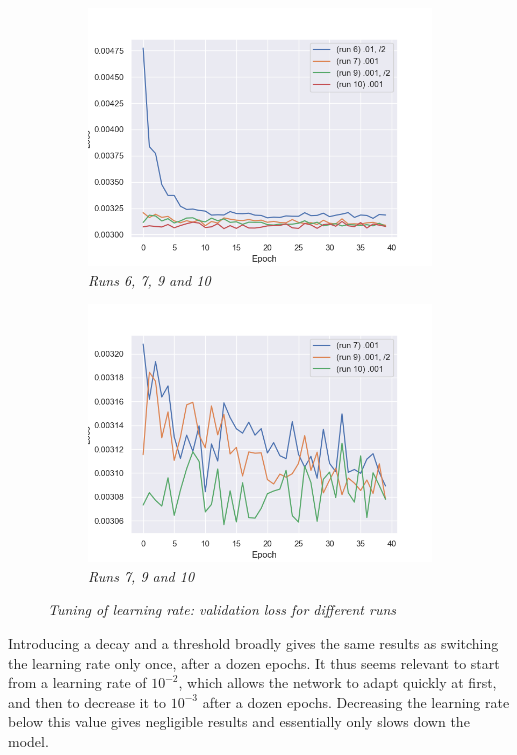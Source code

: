 \documentclass{article}
\begin{document}
\begin{figure}[!ht]
\begin{subfigure}{.39\linewidth}
            \end{subfigure}
            \begin{subfigure}{.49\linewidth}
                \centering
                \includegraphics[width=\linewidth]{pics/hpp-lr-loss-67910.png}
                \caption{\textit{Runs 6, 7, 9 and 10}}
            \end{subfigure}
            \begin{subfigure}{.49\linewidth}
                \centering
                \includegraphics[width=\linewidth]{pics/hpp-lr-loss-7910.png}
                \caption{\textit{Runs 7, 9 and 10}}
            \end{subfigure}
            \caption{\textit{Tuning of learning rate: validation loss for different runs}}
        \end{figure}
        \par
        Introducing a decay and a threshold broadly gives the same results as switching the learning rate only once, after a dozen epochs. It thus seems relevant to start from a learning rate of $10^{-2}$, which allows the network to adapt quickly at first, and then to decrease it to $10^{-3}$ after a dozen epochs. Decreasing the learning rate below this value gives negligible results and essentially only slows down the model.
\end{document}

